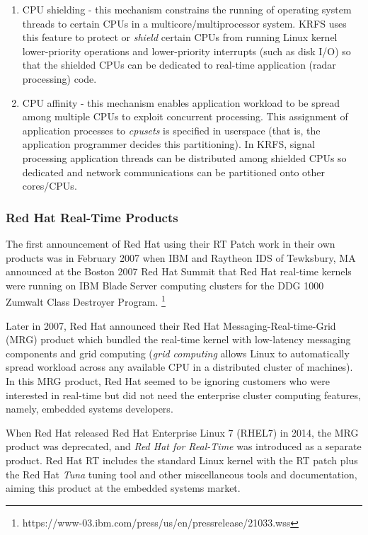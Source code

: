 \documentclass[12pt]{article}
\begin{document}
\begin{enumerate}
\item CPU shielding - this mechanism constrains the running of operating system
threads to certain CPUs in a multicore/multiprocessor system.  KRFS uses this
feature to protect or \emph{shield} certain CPUs from running Linux kernel
lower-priority operations and lower-priority interrupts (such as disk I/O) so
that the shielded CPUs can be dedicated to real-time application (radar
processing) code.
\item CPU affinity - this mechanism enables application workload to be spread
among multiple CPUs to exploit concurrent processing.  This assignment of
application processes to \emph{cpusets} is specified in userspace (that is, the
application programmer decides this partitioning).  In KRFS, signal processing
application threads can be distributed among shielded CPUs so dedicated and
network communications can be partitioned onto other cores/CPUs.
\end{enumerate}

\subsubsection{Red Hat Real-Time Products}
The first announcement of Red Hat using their RT Patch work in their own
products was in February 2007 when IBM and Raytheon IDS of Tewksbury, MA
announced at the Boston 2007 Red Hat Summit that Red Hat real-time kernels were
running on IBM Blade Server computing clusters for the DDG 1000 Zumwalt Class
Destroyer Program.%
\footnote{https://www-03.ibm.com/press/us/en/pressrelease/21033.wss}

Later in 2007, Red Hat announced their Red Hat Messaging-Real-time-Grid (MRG)
product which bundled the real-time kernel with low-latency messaging components
and grid computing (\emph{grid computing} allows Linux to automatically spread
workload across any available CPU in a distributed cluster of machines).  In
this MRG product, Red Hat seemed to be ignoring customers who were interested in
real-time but did not need the enterprise cluster computing features, namely,
embedded systems developers.

When Red Hat released Red Hat Enterprise Linux 7 (RHEL7) in 2014, the MRG
product was deprecated, and \emph{Red Hat for Real-Time} was introduced as a
separate product.  Red Hat RT includes the standard Linux kernel with the RT
patch plus the Red Hat \emph{Tuna} tuning tool and other miscellaneous tools and
documentation, aiming this product at the embedded systems market.
\end{document}
